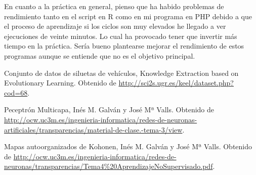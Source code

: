 \documentclass[11pt,spanish,listoffigures,listoftables]{workluis}
\begin{document}
\par En cuanto a la práctica en general, pienso que ha habido problemas de rendimiento tanto en el script en R como en mi programa en PHP debido a que el proceso de aprendizaje si los ciclos son muy elevados he llegado a ver ejecuciones de veinte minutos. Lo cual ha provocado tener que invertir más tiempo en la práctica. Sería bueno plantearse mejorar el rendimiento de estos programas aunque se entiende que no es el objetivo principal.


\begin{thebibliography}{10}


   Conjunto de datos de siluetas de vehículos, 
   \newblock Knowledge Extraction based on Evolutionary Learning. 
   \newblock Obtenido de
   \url{http://sci2s.ugr.es/keel/dataset.php?cod=68}.

   Peceptrón Multicapa, 
   \newblock Inés M. Galván y José Mª Valls.
   \newblock Obtenido de
   \url{http://ocw.uc3m.es/ingenieria-informatica/redes-de-neuronas-artificiales/transparencias/material-de-clase.-tema-3/view}.

   Mapas autoorganizados de Kohonen, 
   \newblock Inés M. Galván y José Mª Valls.
   \newblock Obtenido de
   \url{http://ocw.uc3m.es/ingenieria-informatica/redes-de-neuronas/transparencias/Tema4%20AprendizajeNoSupervisado.pdf}.

   

\end{thebibliography}
\cleardoublepage

\end{document}
